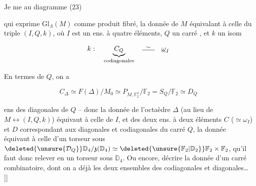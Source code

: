 Je me  au diagramme (23)


qui exprime $\mathrm{Gl}_\Lambda(M)$ comme produit fibré, la donnée de $M$ équivalant à celle du triple $(I,Q,k)$, où $I$ est un ens. à quatre éléments, $Q$ un carré , et $k$ un isom

\[
k:\quad\underbrace{C_Q}_{\text{codiagonales}}\quad\overset{\sim}{\rule[.2ex]{1.8em}{.4pt}}\quad\underline\omega_I
\]

En termes de $Q$, on a

\[
 C_\Delta\simeq F(\Delta)/M_0\simeq P_{M,\mathbb F_2^{\underline\omega}}/\mathbb F_2=S_Q/\mathbb F_2\simeq D_Q
\]

ens des diagonales de $Q$ -- donc la donnée de l'octaèdre $\Delta$ (au lieu de $M\longleftrightarrow(I,Q,k)$) équivaut à celle de $I$, et des deux ens. à deux éléments $C$ ($\simeq\omega_I$) et $D$ correspondant aux diagonales et codiagonales du carré $Q$,  la donnée équivaut à celle d'un torseur sous $\deleted{\unsure{\mathcal D_Q}}\mathbb D_4/\mathfrak z(\mathbb D_4)\simeq\deleted{\unsure{\mathbb F_2|\mathbb D_2}}\mathbb F_2\times\mathbb F_2$, qu'il faut donc relever en un torseur sous $\mathbb D_4$. Ou encore, décrire la donnée d'un carré combinatoire, dont on a déjà les deux ensembles  des codiagonales et diagonales\ldots\ $]\!]$
